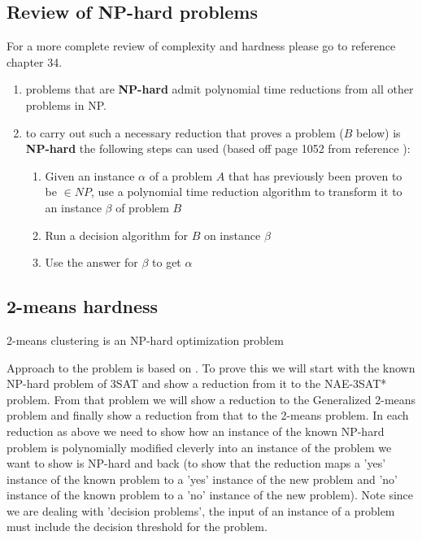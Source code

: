 \subsection{Review of NP-hard problems}
For a more complete review of complexity and hardness please go to
reference \cite{cor2009} chapter 34. 
\begin{enumerate}
\item problems that are \textbf{NP-hard} admit polynomial time
  reductions from all other problems in NP.
\item to carry out such a necessary reduction that proves a problem
  ($B$ below) is \textbf{NP-hard} the following steps can used (based
  off page 1052 from reference \cite{cor2009}): 
\begin{enumerate}
\item Given an instance $\alpha$ of a problem $A$ that has previously
  been proven to be $\in NP$, use a polynomial time reduction
  algorithm to transform it to an instance $\beta$ of problem $B$ 
\item Run a decision algorithm for $B$ on instance $\beta$ 
\item Use the answer for $\beta$ to get $\alpha$
\end{enumerate} 
\end{enumerate} 

\subsection{2-means hardness}
\begin{theorem}\label{2-means-np-hard}
2-means clustering is an NP-hard optimization problem
\end{theorem} 

Approach to the problem is based on \cite{das2008}.  To prove this we
will start with the known NP-hard problem of 3SAT and show a reduction
from it to the NAE-3SAT* problem.  From that problem we will show a
reduction to the Generalized 2-means problem and finally show a
reduction from that to the 2-means problem.  In each reduction as
above we need to show how an instance of the known NP-hard problem is
polynomially modified cleverly into an instance of the problem we want
to show is NP-hard and back (to show that the reduction maps a 'yes'
instance of the known problem to a 'yes' instance of the new problem
and 'no' instance of the known problem to a 'no' instance of the new
problem).  Note since we are dealing with 'decision problems', the
input of an instance of a problem must include the decision threshold
for the problem.


